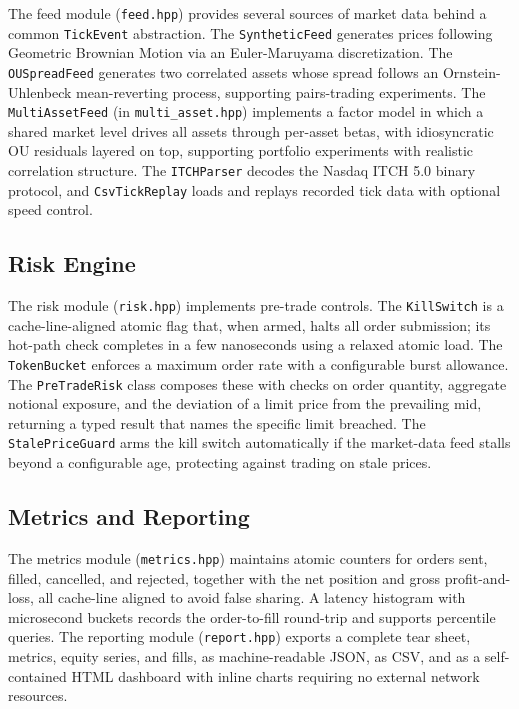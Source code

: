 \documentclass[12pt,oneside,a4paper]{report}
\begin{document}
The feed module (\texttt{feed.hpp}) provides several sources of market data behind a common \texttt{TickEvent} abstraction. The \texttt{SyntheticFeed} generates prices following Geometric Brownian Motion via an Euler-Maruyama discretization. The \texttt{OUSpreadFeed} generates two correlated assets whose spread follows an Ornstein-Uhlenbeck mean-reverting process, supporting pairs-trading experiments. The \texttt{MultiAssetFeed} (in \texttt{multi\_asset.hpp}) implements a factor model in which a shared market level drives all assets through per-asset betas, with idiosyncratic OU residuals layered on top, supporting portfolio experiments with realistic correlation structure. The \texttt{ITCHParser} decodes the Nasdaq ITCH 5.0 binary protocol, and \texttt{CsvTickReplay} loads and replays recorded tick data with optional speed control.

\subsection{Risk Engine}

The risk module (\texttt{risk.hpp}) implements pre-trade controls. The \texttt{KillSwitch} is a cache-line-aligned atomic flag that, when armed, halts all order submission; its hot-path check completes in a few nanoseconds using a relaxed atomic load. The \texttt{TokenBucket} enforces a maximum order rate with a configurable burst allowance. The \texttt{PreTradeRisk} class composes these with checks on order quantity, aggregate notional exposure, and the deviation of a limit price from the prevailing mid, returning a typed result that names the specific limit breached. The \texttt{StalePriceGuard} arms the kill switch automatically if the market-data feed stalls beyond a configurable age, protecting against trading on stale prices.

\subsection{Metrics and Reporting}

The metrics module (\texttt{metrics.hpp}) maintains atomic counters for orders sent, filled, cancelled, and rejected, together with the net position and gross profit-and-loss, all cache-line aligned to avoid false sharing. A latency histogram with microsecond buckets records the order-to-fill round-trip and supports percentile queries. The reporting module (\texttt{report.hpp}) exports a complete tear sheet, metrics, equity series, and fills, as machine-readable JSON, as CSV, and as a self-contained HTML dashboard with inline charts requiring no external network resources.
\end{document}
